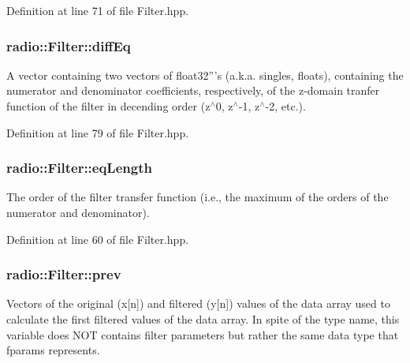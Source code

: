 Definition at line 71 of file Filter.\+hpp.

\hypertarget{classradio_1_1Filter_abe705768a267844edfa2aaabfdac9f56}{
\subsubsection[{diff\+Eq}]{ radio\+::\+Filter\+::diff\+Eq\hspace{0.3cm}{\ttfamily [protected]}}}\label{classradio_1_1Filter_abe705768a267844edfa2aaabfdac9f56}
A vector containing two vectors of float32'''s (a.\+k.\+a. singles, floats), containing the numerator and denominator coefficients, respectively, of the z-\/domain tranfer function of the filter in decending order (z$^\wedge$0, z$^\wedge$-\/1, z$^\wedge$-\/2, etc.). 

Definition at line 79 of file Filter.\+hpp.

\hypertarget{classradio_1_1Filter_a26a32320c4dffa8925ab5f0f06689e8d}{
\subsubsection[{eq\+Length}]{ radio\+::\+Filter\+::eq\+Length\hspace{0.3cm}{\ttfamily [protected]}}}\label{classradio_1_1Filter_a26a32320c4dffa8925ab5f0f06689e8d}
The order of the filter transfer function (i.\+e., the maximum of the orders of the numerator and denominator). 

Definition at line 60 of file Filter.\+hpp.

\hypertarget{classradio_1_1Filter_ae7e324e76354063772bcb5f241a2eae9}{
\subsubsection[{prev}]{ radio\+::\+Filter\+::prev\hspace{0.3cm}{\ttfamily [protected]}}}\label{classradio_1_1Filter_ae7e324e76354063772bcb5f241a2eae9}
Vectors of the original (x\mbox{[}n\mbox{]}) and filtered (y\mbox{[}n\mbox{]}) values of the data array used to calculate the first filtered values of the data array. In spite of the type name, this variable does N\+O\+T contains filter parameters but rather the same data type that fparams represents. 

